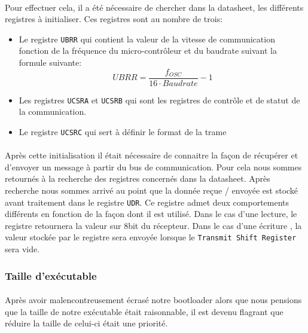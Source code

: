 \paragraph{}
Pour effectuer cela, il a été nécessaire de chercher dans la datasheet, les
différents registres à initialiser. Ces registres sont au nombre de trois:
\begin{itemize}
  \item Le registre \verb!UBRR! qui contient la valeur de la vitesse de communication
    fonction de la fréquence du micro-contrôleur et du baudrate suivant la
    formule suivante:\begin{equation}
      UBRR = \frac{f_{OSC}}{16 \cdot Baudrate} -1
      \label{baudrate}
    \end{equation}
  \item Les registres \verb!UCSRA! et \verb!UCSRB! qui sont les registres de contrôle et de
    statut de la communication.
  \item Le registre \verb!UCSRC! qui sert à définir le format de la trame
\end{itemize}

\paragraph{}
Après cette initialisation il était nécessaire de connaitre la façon de
récupérer et d'envoyer un message à partir du bus de communication. Pour cela
nous sommes retournés à la recherche des registres concernés dans la datasheet.
Après recherche nous sommes arrivé au point que la donnée reçue / envoyée est
stocké avant traitement dans le registre \verb!UDR!. Ce registre admet deux
comportements différents en fonction de la façon dont il est utilisé. Dans le
cas d'une lecture, le registre retournera la valeur sur 8bit du récepteur. Dans
le cas d'une écriture , la valeur stockée par le registre sera envoyée lorsque
le \verb!Transmit Shift Register! sera vide.


\subsubsection{Taille d'exécutable}
\paragraph{}
Après avoir malencontreusement écrasé notre bootloader alors que nous pensions
que la taille de notre exécutable était raisonnable, il est devenu flagrant que
réduire la taille de celui-ci était une priorité.

